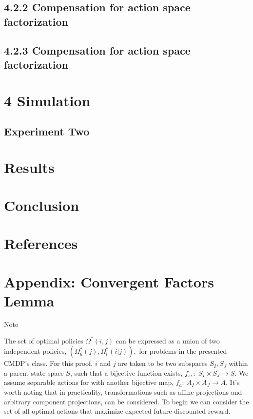 \documentclass[compsoc,journal,letterpaper,10pt,draftclsnofoot,onecolumn]{IEEEtran}
\begin{document}
\subsection{4.2.2 Compensation for action space
factorization}\label{compensation-for-action-space-factorization}

\subsection{4.2.3 Compensation for action space
factorization}\label{compensation-for-action-space-factorization-1}

\section{}\label{section-1}

\section{4 Simulation}\label{simulation-1}

\subsection{Experiment Two}\label{experiment-two}

\section{Results}\label{results}

\section{Conclusion}\label{conclusion}

\section{References}\label{references}

\section{Appendix: Convergent Factors
Lemma}\label{appendix-convergent-factors-lemma}

Note

The set of optimal policies \(\Omega_{\ }^{*}\left( i,j \right)\) can be
expressed as a union of two independent policies,
\(\left( \Omega_{u}^{*}\left( j \right),\Omega_{l}^{*}\left( i|j \right) \right),\)
for problems in the presented CMDP's class. For this proof, \(i\) and
\(j\) are taken to be two subspaces \(S_{I},S_{J}\) within a parent
state space \(S\), such that a bijective function exists,
\(f_{s},:\ S_{I} \times S_{J} \rightarrow S.\) We assume separable
actions for with another bijective map,
\(f_{a}:\ A_{I} \times A_{J} \rightarrow A\). It's worth noting that in
practicality, transformations such as affine projections and arbitrary
component projections, can be considered. To begin we can consider the
set of all optimal actions that maximize expected future discounted
reward.
\end{document}
